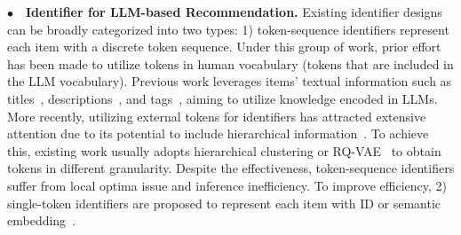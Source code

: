 \vspace{2pt}
\noindent$\bullet\quad$\textbf{Identifier for LLM-based Recommendation.} 
Existing identifier designs can be broadly categorized into two types: 
1) token-sequence identifiers represent each item with a discrete token sequence. 
Under this group of work, 
prior effort has been made to utilize tokens in human vocabulary (\ie tokens that are included in the LLM vocabulary). 
Previous work leverages items' textual information such as titles~\cite{bao2023bi}, descriptions~\cite{cui2022m6}, and tags~\cite{tan2024idgenrec}, aiming to utilize knowledge encoded in LLMs. 
More recently, utilizing external tokens for identifiers has attracted extensive attention due to its potential to include hierarchical information~\cite{zhu2024cost,zheng2024adapting,wang2024content}. 
To achieve this, existing work usually adopts hierarchical clustering or RQ-VAE~\cite{lee2022autoregressive} to obtain tokens in different granularity. 
Despite the effectiveness, token-sequence identifiers suffer from local optima issue and inference inefficiency. 
To improve efficiency, 
2) single-token identifiers are proposed to represent each item with ID or semantic embedding~\cite{li2023e4srec,wang2024rethinking}. 
